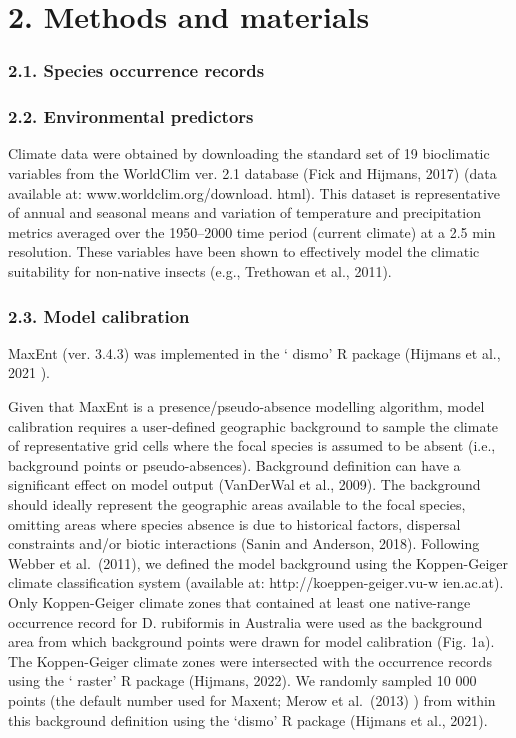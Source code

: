 \documentclass[
  authoryear,
  preprint,
  3p,
  twocolumn]{elsarticle}
\begin{document}
\hypertarget{methods-and-materials}{%
\section{2. Methods and materials}\label{methods-and-materials}}

\hypertarget{species-occurrence-records}{%
\subsubsection{2.1. Species occurrence
records}\label{species-occurrence-records}}

\hypertarget{environmental-predictors}{%
\subsubsection{2.2. Environmental
predictors}\label{environmental-predictors}}

Climate data were obtained by downloading the standard set of 19
bioclimatic variables from the WorldClim ver. 2.1 database (Fick and
Hijmans, 2017) (data available at: www.worldclim.org/download. html).
This dataset is representative of annual and seasonal means and
variation of temperature and precipitation metrics averaged over the
1950--2000 time period (current climate) at a 2.5 min resolution. These
variables have been shown to effectively model the climatic suitability
for non-native insects (e.g., Trethowan et al., 2011).

\hypertarget{model-calibration}{%
\subsubsection{2.3. Model calibration}\label{model-calibration}}

MaxEnt (ver. 3.4.3) was implemented in the ` dismo' R package (Hijmans
et al., 2021 ).

Given that MaxEnt is a presence/pseudo-absence modelling algorithm,
model calibration requires a user-defined geographic background to
sample the climate of representative grid cells where the focal species
is assumed to be absent (i.e., background points or pseudo-absences).
Background definition can have a significant effect on model output
(VanDerWal et al., 2009). The background should ideally represent the
geographic areas available to the focal species, omitting areas where
species absence is due to historical factors, dispersal constraints
and/or biotic interactions (Sanin and Anderson, 2018). Following Webber
et al.~(2011), we defined the model background using the Koppen-Geiger
climate classification system (available at: http://koeppen-geiger.vu-w
ien.ac.at). Only Koppen-Geiger climate zones that contained at least one
native-range occurrence record for D. rubiformis in Australia were used
as the background area from which background points were drawn for model
calibration (Fig. 1a). The Koppen-Geiger climate zones were intersected
with the occurrence records using the ` raster' R package (Hijmans,
2022). We randomly sampled 10 000 points (the default number used for
Maxent; Merow et al.~(2013) ) from within this background definition
using the `dismo' R package (Hijmans et al., 2021).
\end{document}
